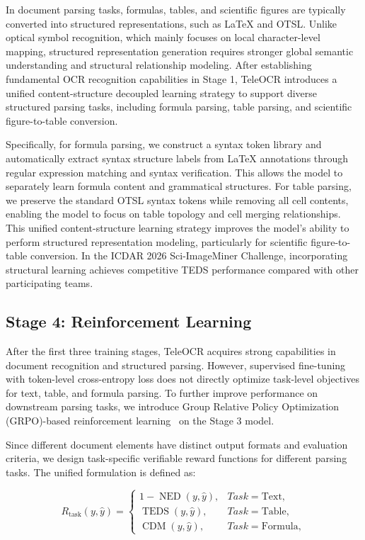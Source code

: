 \documentclass{fairmeta}
\begin{document}
In document parsing tasks, formulas, tables, and scientific figures are typically converted into structured representations, such as LaTeX and OTSL. Unlike optical symbol recognition, which mainly focuses on local character-level mapping, structured representation generation requires stronger global semantic understanding and structural relationship modeling. After establishing fundamental OCR recognition capabilities in Stage 1, TeleOCR introduces a unified content-structure decoupled learning strategy to support diverse structured parsing tasks, including formula parsing, table parsing, and scientific figure-to-table conversion.

Specifically, for formula parsing, we construct a syntax token library and automatically extract syntax structure labels from LaTeX annotations through regular expression matching and syntax verification. This allows the model to separately learn formula content and grammatical structures. For table parsing, we preserve the standard OTSL syntax tokens while removing all cell contents, enabling the model to focus on table topology and cell merging relationships. This unified content-structure learning strategy improves the model’s ability to perform structured representation modeling, particularly for scientific figure-to-table conversion. In the ICDAR 2026 Sci-ImageMiner Challenge, incorporating structural learning achieves competitive TEDS performance compared with other participating teams.


\subsection{Stage 4: Reinforcement Learning}
After the first three training stages, TeleOCR acquires strong capabilities in document recognition and structured parsing. However, supervised fine-tuning with token-level cross-entropy loss does not directly optimize task-level objectives for text, table, and formula parsing. To further improve performance on downstream parsing tasks, we introduce Group Relative Policy Optimization (GRPO)-based reinforcement learning~\cite{shao2024deepseekmath} on the Stage 3 model.

Since different document elements have distinct output formats and evaluation criteria, we design task-specific verifiable reward functions for different parsing tasks. The unified formulation is defined as:

\begin{equation}
R_{\mathrm{task}}(y,\hat{y})=
\begin{cases}
1-\operatorname{NED}(y,\hat{y}), & Task=\mathrm{Text},\\
\operatorname{TEDS}(y,\hat{y}), & Task=\mathrm{Table},\\
\operatorname{CDM}(y,\hat{y}), & Task=\mathrm{Formula},
\end{cases}
\end{equation}
\end{document}
